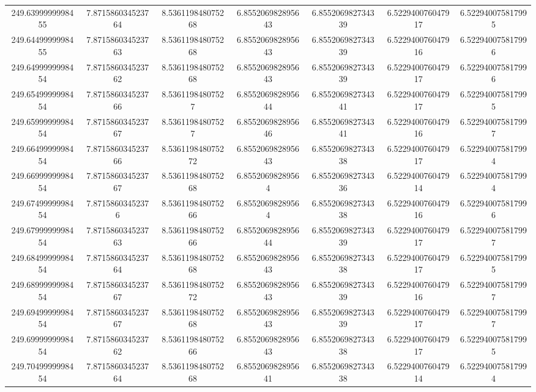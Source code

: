\begin{center}
{\begin{tabular}{| c | c | c | c | c | c | c |}
249.6399999998455  & 7.871586034523764  & 8.536119848075268  & 6.855206982895643  & 6.855206982734339  & 6.522940076047917  & 6.522940075817995 \\
249.6449999998455  & 7.871586034523763  & 8.536119848075268  & 6.855206982895643  & 6.855206982734339  & 6.522940076047916  & 6.522940075817996 \\
249.6499999998454  & 7.871586034523762  & 8.536119848075268  & 6.855206982895643  & 6.855206982734339  & 6.522940076047917  & 6.522940075817996 \\
249.6549999998454  & 7.871586034523766  & 8.53611984807527  & 6.855206982895644  & 6.855206982734341  & 6.522940076047917  & 6.522940075817995 \\
249.6599999998454  & 7.871586034523767  & 8.53611984807527  & 6.855206982895646  & 6.855206982734341  & 6.522940076047916  & 6.522940075817997 \\
249.6649999998454  & 7.871586034523766  & 8.536119848075272  & 6.855206982895643  & 6.855206982734338  & 6.522940076047917  & 6.522940075817994 \\
249.6699999998454  & 7.871586034523767  & 8.536119848075268  & 6.85520698289564  & 6.855206982734336  & 6.522940076047914  & 6.522940075817994 \\
249.6749999998454  & 7.87158603452376  & 8.536119848075266  & 6.85520698289564  & 6.855206982734338  & 6.522940076047916  & 6.522940075817996 \\
249.6799999998454  & 7.871586034523763  & 8.536119848075266  & 6.855206982895644  & 6.855206982734339  & 6.522940076047917  & 6.522940075817997 \\
249.6849999998454  & 7.871586034523764  & 8.536119848075268  & 6.855206982895643  & 6.855206982734338  & 6.522940076047917  & 6.522940075817995 \\
249.6899999998454  & 7.871586034523767  & 8.536119848075272  & 6.855206982895643  & 6.855206982734339  & 6.522940076047916  & 6.522940075817997 \\
249.6949999998454  & 7.871586034523767  & 8.536119848075268  & 6.855206982895643  & 6.855206982734339  & 6.522940076047917  & 6.522940075817997 \\
249.6999999998454  & 7.871586034523762  & 8.536119848075266  & 6.855206982895643  & 6.855206982734338  & 6.522940076047917  & 6.522940075817995 \\
249.7049999998454  & 7.871586034523764  & 8.536119848075268  & 6.855206982895641  & 6.855206982734338  & 6.522940076047914  & 6.522940075817994 \\

\end{tabular}}
\end{center}
